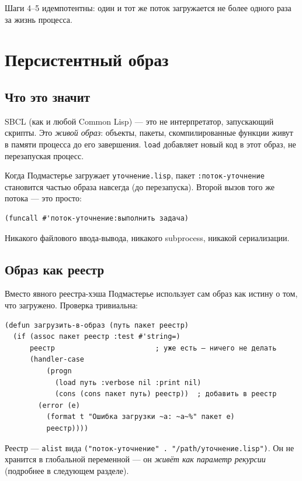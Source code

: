 \documentclass[11pt,a4paper]{article}
\begin{document}
Шаги 4–5 идемпотентны: один и тот же поток загружается не более одного раза за жизнь процесса.

\section{Персистентный образ}
\label{sec:image}

\subsection{Что это значит}

SBCL (как и любой Common Lisp) — это не интерпретатор, запускающий скрипты. Это \textit{живой образ}: объекты, пакеты, скомпилированные функции живут в памяти процесса до его завершения. \texttt{load} добавляет новый код в этот образ, не перезапуская процесс.

Когда Подмастерье загружает \texttt{уточнение.lisp}, пакет \texttt{:поток-уточнение} становится частью образа навсегда (до перезапуска). Второй вызов того же потока — это просто:

\begin{lstlisting}
(funcall #'поток-уточнение:выполнить задача)
\end{lstlisting}

Никакого файлового ввода-вывода, никакого subprocess, никакой сериализации.

\subsection{Образ как реестр}

Вместо явного реестра-хэша Подмастерье использует сам образ как истину о том, что загружено. Проверка тривиальна:

\begin{lstlisting}[caption={Образ как реестр — find-package как ключ}]
(defun загрузить-в-образ (путь пакет реестр)
  (if (assoc пакет реестр :test #'string=)
      реестр                        ; уже есть — ничего не делать
      (handler-case
          (progn
            (load путь :verbose nil :print nil)
            (cons (cons пакет путь) реестр))  ; добавить в реестр
        (error (e)
          (format t "Ошибка загрузки ~a: ~a~%" пакет e)
          реестр))))
\end{lstlisting}

Реестр — \texttt{alist} вида \texttt{("поток-уточнение" . "/path/уточнение.lisp")}. Он не хранится в глобальной переменной — он \textit{живёт как параметр рекурсии} (подробнее в следующем разделе).
\end{document}
